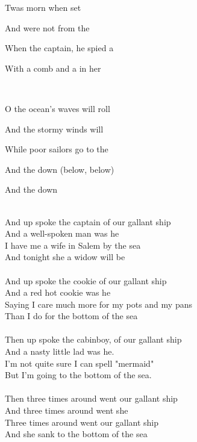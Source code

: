 \begin{SBVerse*}
Twas  morn when  set 

And  were not  from the 

When the captain, he spied a  

With a comb and a  in her 
\end{SBVerse*}

~\\

\begin{SBChorus}
O the ocean's waves will roll

And the stormy winds will 

While  poor sailors go  to the 

And the   down  (below, below)

And the   down 
\end{SBChorus}
~\\
And up spoke the captain of our gallant ship\\ 
And a well-spoken man was he\\ 
I have me a wife in Salem by the sea\\ 
And tonight she a widow will be\\ 
~\\
And up spoke the cookie of our gallant ship\\ 
And a red hot cookie was he\\ 
Saying I care much more for my pots and my pans\\ 
Than I do for the bottom of the sea\\ 
~\\
Then up spoke the cabinboy, of our gallant ship\\ 
And a nasty little lad was he.\\ 
I'm not quite sure I can spell "mermaid"\\ 
But I'm going to the bottom of the sea.\\ 
~\\
Then three times around went our gallant ship\\ 
And three times around went she\\ 
Three times around went our gallant ship\\ 
And she sank to the bottom of the sea\\ 




